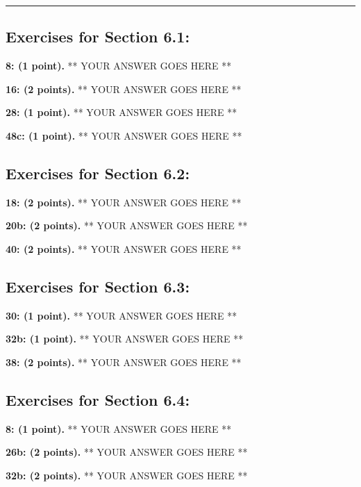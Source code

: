 \documentclass[12pt]{article}  %
\begin{document}
\rule{6in}{.1pt}       %


\subsection*{Exercises for Section 6.1:}     

\noindent
{\bf 8: (1 point).}
** YOUR ANSWER GOES HERE **

\noindent
{\bf 16: (2 points).}
** YOUR ANSWER GOES HERE **

\noindent
{\bf 28: (1 point).}
** YOUR ANSWER GOES HERE **

\noindent
{\bf 48c: (1 point).}
** YOUR ANSWER GOES HERE **

\subsection*{Exercises for Section 6.2:}     
\noindent
{\bf 18: (2 points).}
** YOUR ANSWER GOES HERE **

\noindent
{\bf 20b: (2 points).}
** YOUR ANSWER GOES HERE **

\noindent
{\bf 40: (2 points).}
** YOUR ANSWER GOES HERE **

\subsection*{Exercises for Section 6.3:}     

\noindent
{\bf 30: (1 point).}
** YOUR ANSWER GOES HERE **


\noindent
{\bf 32b: (1 point).}
** YOUR ANSWER GOES HERE **

\noindent
{\bf 38: (2 points).}
** YOUR ANSWER GOES HERE **


\subsection*{Exercises for Section 6.4:}     

\noindent
{\bf 8: (1 point).}
** YOUR ANSWER GOES HERE **

\noindent
{\bf 26b: (2 points).}
** YOUR ANSWER GOES HERE **

\noindent
{\bf 32b: (2 points).}
** YOUR ANSWER GOES HERE **
\end{document}
